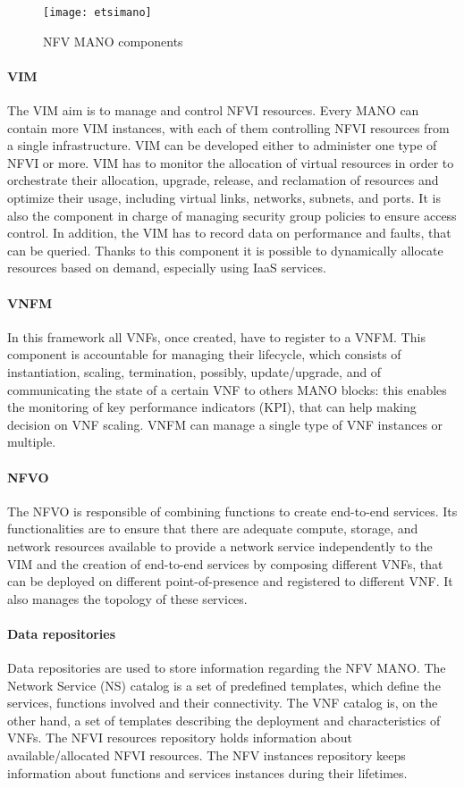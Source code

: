 \begin{figure}
  \centering
  \texttt{[image: etsimano]}
  \caption{NFV MANO components}
  \label{chap:background:img:etsimano}
\end{figure}


\paragraph*{VIM}
The VIM aim is to manage and control NFVI resources. Every MANO can contain more
VIM instances, with each of them controlling NFVI resources from a single
infrastructure.
VIM can be developed either to administer one type of NFVI or more. VIM has to
monitor the allocation of virtual resources in order to orchestrate their
allocation, upgrade, release, and reclamation of resources and optimize their
usage, including virtual links, networks, subnets, and ports. It is also the
component in charge of managing security group policies to ensure access
control. In addition, the VIM has to record data on performance and faults, that
can be queried. Thanks to this component it is possible to dynamically allocate
resources based on demand, especially using IaaS services.

\paragraph*{VNFM} 
In this framework all VNFs, once created, have to register to a VNFM. This
component is accountable for managing their lifecycle, which consists of
instantiation, scaling, termination, possibly, update/upgrade, and of
communicating the state of a certain VNF to others MANO blocks: this enables the
monitoring of key performance indicators (KPI), that can help making decision
on VNF scaling. VNFM can manage a single type of VNF instances or multiple.

\paragraph*{NFVO}
The NFVO is responsible of combining functions to create end-to-end services.
Its functionalities are to ensure that there are adequate compute, storage, and
network resources available to provide a network service independently to the
VIM and the creation of end-to-end services by composing different VNFs, that
can be deployed on different point-of-presence and registered to different VNF.
It also manages the topology of these services. 

\paragraph*{Data repositories} Data repositories are used to store information
regarding the NFV MANO. The Network Service (NS) catalog is a set of predefined
templates, which define the services, functions involved and their connectivity.
The VNF catalog is, on the other hand, a set of templates describing the
deployment and characteristics of VNFs. The NFVI resources repository holds
information about available/allocated NFVI resources. The NFV instances
repository keeps information about functions and services instances during their
lifetimes.

